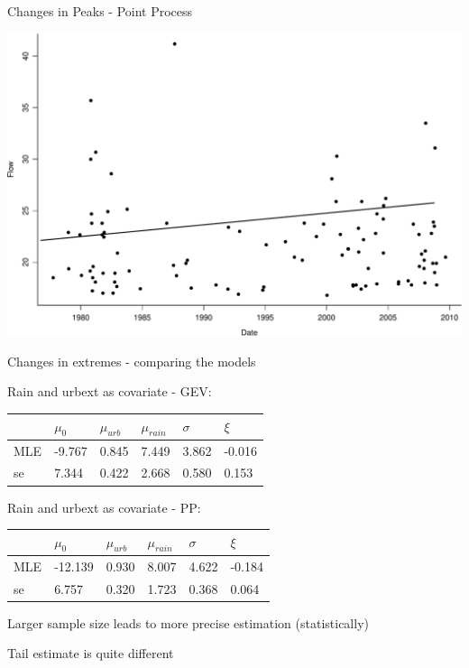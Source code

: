 \documentclass[
  10pt,
  ignorenonframetext,
  compress]{beamer}
\begin{document}
\begin{frame}{Changes in Peaks - Point Process}
\protect\hypertarget{changes-in-peaks---point-process}{}

\includegraphics{ProsdocimiPerugia_files/figure-beamer/ppFirstPlot-1.pdf}

\end{frame}

\begin{frame}{Changes in extremes - comparing the models}
\protect\hypertarget{changes-in-extremes---comparing-the-models}{}

Rain and urbext as covariate - GEV:

\begin{longtable}[]{@{}llllll@{}}
\toprule
& \(\mu_0\) & \(\mu_{urb}\) & \(\mu_{rain}\) & \(\sigma\) &
\(\xi\)\tabularnewline
\midrule
\endhead
MLE & -9.767 & 0.845 & 7.449 & 3.862 & -0.016\tabularnewline
se & 7.344 & 0.422 & 2.668 & 0.580 & 0.153\tabularnewline
\bottomrule
\end{longtable}

\vspace{-0.2cm}

Rain and urbext as covariate - PP:

\begin{longtable}[]{@{}llllll@{}}
\toprule
& \(\mu_0\) & \(\mu_{urb}\) & \(\mu_{rain}\) & \(\sigma\) &
\(\xi\)\tabularnewline
\midrule
\endhead
MLE & -12.139 & 0.930 & 8.007 & 4.622 & -0.184\tabularnewline
se & 6.757 & 0.320 & 1.723 & 0.368 & 0.064\tabularnewline
\bottomrule
\end{longtable}

\pause

Larger sample size leads to more precise estimation (statistically)

Tail estimate is quite different

\end{frame}
\end{document}
